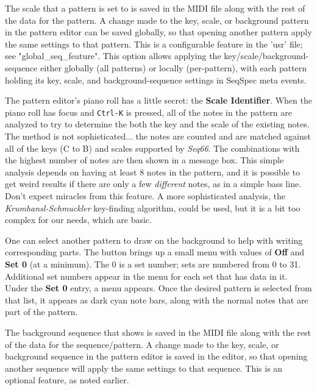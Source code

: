    The scale that a pattern is set to is
   saved in the MIDI file along with the rest of the data for the pattern.
   A change made to the key, scale, or background pattern in
   the pattern editor can be saved globally, so that opening another pattern
   apply the same settings to that pattern.  This is a configurable feature in
   the 'usr' file; see "global\_seq\_feature".
   This option allows applying the key/scale/background-sequence
   either globally (all patterns) or locally (per-pattern), with each pattern
   holding its key, scale, and background-sequence settings in
   SeqSpec meta events.

   The pattern editor's piano roll has a little secret:
   the \textbf{Scale Identifier}.
   When the piano roll has focus and \texttt{Ctrl-K} is pressed,
   all of the notes in the pattern are analyzed to try to determine
   the both the key and the scale of the existing notes.
   The method is not sophisticated... the notes are counted and are matched
   against all of the keys (C to B) and scales supported by \textsl{Seq66}.
   The combinations with the highest number of notes are then shown in a
   message box.
   This simple analysis depends on having at least 8 notes in the pattern, and
   it is possible to get weird results if
   there are only a few \textsl{different}
   notes, as in a simple bass line.
   Don't expect miracles from this feature.
   A more sophisticated analysis, the
   \textsl{Krumhansl-Schmuckler} key-finding
   algorithm, could be used, but it is a bit too complex
   for our needs, which are basic.

   One can select another pattern to draw on the background to help with
   writing corresponding parts.
   The button brings up a small menu with values of \textbf{Off} and
   \textbf{Set 0} (at a minimum).
   The 0 is a set number; sets are numbered from 0 to 31.
   Additional set numbers appear in the menu for each set that has data in it.
   Under the \textbf{Set 0} entry, a menu appears.
   Once the desired pattern is selected from that list, it appears as dark cyan
   note bars, along with the normal notes that are part of the pattern.

   The background sequence that shows is saved in the MIDI file
   along with the rest of the data for the sequence/pattern.
   A change made to the key, scale, or background sequence in
   the pattern editor is saved in the editor, so that opening another sequence
   will apply the same settings to that sequence.
   This is an optional feature, as noted earlier.

